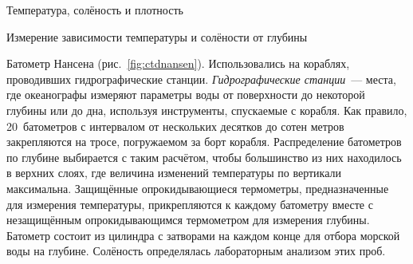 \begin{chapter}{Температура, солёность и плотность}
\begin{section}{Измерение зависимости температуры и солёности от глубины}
\begin{paragraph}{Батометр Нансена}
(рис.~\ref{fig:ctdnansen}). Использовались на кораблях, проводивших 
гидрографические станции. \emph{Гидрографические станции}~--- места, 
где океанографы измеряют параметры воды от поверхности до некоторой глубины 
или до дна, используя инструменты, спускаемые с корабля. Как правило, 
20~батометров с интервалом от нескольких десятков до сотен метров закрепляются 
на тросе, погружаемом за борт корабля. Распределение батометров по глубине
выбирается с таким расчётом, чтобы большинство из них находилось в верхних
слоях, где величина изменений температуры по вертикали максимальна.
Защищённые опрокидывающиеся термометры, предназначенные для измерения
температуры, прикрепляются к каждому батометру вместе с незащищённым
опрокидывающимся термометром для измерения глубины. Батометр состоит
из цилиндра с затворами на каждом конце для отбора морской воды на
глубине. Солёность определялась лабораторным анализом этих проб.
%


\end{paragraph}
\end{section}
\end{chapter}
